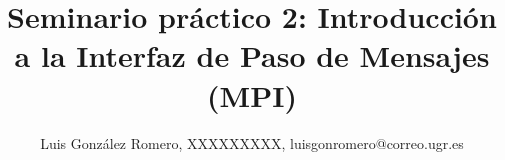 \author{Luis González Romero, XXXXXXXXX, luisgonromero@correo.ugr.es}
\title{Seminario práctico 2: Introducción a la Interfaz de Paso de
Mensajes (MPI)}
\newcommand{\grupopracticas}{Grupo 1: Miércoles 09:30-11:30}
\newcommand{\subtitulo}{Subtítulo}
\newcommand{\curso}{Programación Paralela}
\newcommand{\departamento}{Lenguajes y Sistemas Informáticos}